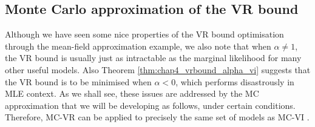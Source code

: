 
\subsection{Monte Carlo approximation of the VR bound}
\label{sec:chap4_vrbound_sampling}

Although we have seen some nice properties of the VR bound optimisation through the mean-field approximation example, we also note that when $\alpha \neq 1$, the VR bound is usually just as intractable as the marginal likelihood for many other useful models. Also Theorem \ref{thm:chap4_vrbound_alpha_vi} suggests that the VR bound is to be minimised when $\alpha < 0$, which performs disastrously in MLE context.
%
 As we shall see, these issues are addressed by the MC approximation that we will be developing as follows, under certain conditions. Therefore, MC-VR can be applied to precisely the same set of models as MC-VI \citep{paisley:bbvi2012, salimans:reparam2013, ranganath:bbvi2014, kucukelbir:advi2015}.

